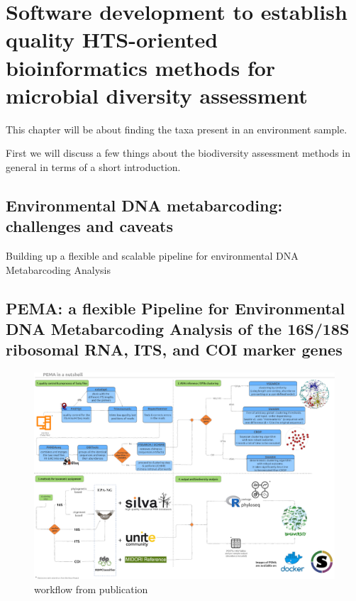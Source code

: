 % 
% 

\chapter{Software development to establish quality HTS-oriented bioinformatics methods for microbial diversity assessment}
\label{cha:2}

This chapter will be about finding the taxa present in an environment sample. 

First we will discuss a few things about the biodiversity assessment methods in general in terms of a short introduction. 

\section{Environmental DNA metabarcoding: challenges and caveats}
Building up a flexible and scalable pipeline for environmental DNA Metabarcoding Analysis


\section{PEMA: a flexible Pipeline for Environmental DNA Metabarcoding Analysis of the 16S/18S ribosomal RNA, ITS, and COI marker genes}


\begin{figure}{}
   \centering
   \includegraphics{figures/pema_workflow.jpeg}
   \caption{workflow from publication}
\end{figure}





